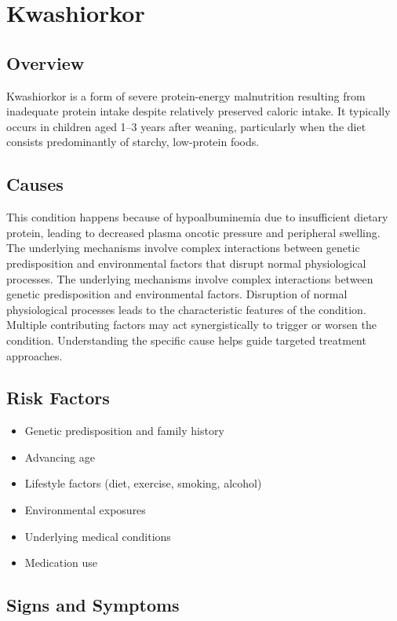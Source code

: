 \chapter{Kwashiorkor}
\label{sec:Kwashiorkor}

\section{Overview}
Kwashiorkor is a form of severe protein-energy malnutrition resulting from inadequate protein intake despite relatively preserved caloric intake. It typically occurs in children aged 1--3 years after weaning, particularly when the diet consists predominantly of starchy, low-protein foods.
\section{Causes}
This condition happens because of hypoalbuminemia due to insufficient dietary protein, leading to decreased plasma oncotic pressure and peripheral swelling. The underlying mechanisms involve complex interactions between genetic predisposition and environmental factors that disrupt normal physiological processes. The underlying mechanisms involve complex interactions between genetic predisposition and environmental factors. Disruption of normal physiological processes leads to the characteristic features of the condition. Multiple contributing factors may act synergistically to trigger or worsen the condition. Understanding the specific cause helps guide targeted treatment approaches.
\section{Risk Factors}


\begin{itemize}[noitemsep]
  \item Genetic predisposition and family history
  \item Advancing age
  \item Lifestyle factors (diet, exercise, smoking, alcohol)
  \item Environmental exposures
  \item Underlying medical conditions
  \item Medication use
\end{itemize}
\section{Signs and Symptoms}

